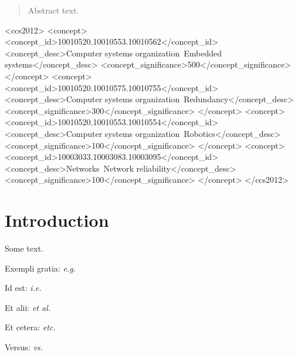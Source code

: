 \documentclass{sig-alternate-05-2015}
\newcommand{\eg}{\textit{e.g.}\xspace}
\newcommand{\etal}{\textit{et al.}\xspace}
\newcommand{\ie}{\textit{i.e.}\xspace}
\newcommand{\etc}{\textit{etc.}\xspace}
\newcommand{\vs}{\textit{vs.}\xspace}
\begin{document}
\maketitle
\begin{abstract}
Abstract text.
\end{abstract}


%
%
\begin{CCSXML}
<ccs2012>
 <concept>
  <concept_id>10010520.10010553.10010562</concept_id>
  <concept_desc>Computer systems organization~Embedded systems</concept_desc>
  <concept_significance>500</concept_significance>
 </concept>
 <concept>
  <concept_id>10010520.10010575.10010755</concept_id>
  <concept_desc>Computer systems organization~Redundancy</concept_desc>
  <concept_significance>300</concept_significance>
 </concept>
 <concept>
  <concept_id>10010520.10010553.10010554</concept_id>
  <concept_desc>Computer systems organization~Robotics</concept_desc>
  <concept_significance>100</concept_significance>
 </concept>
 <concept>
  <concept_id>10003033.10003083.10003095</concept_id>
  <concept_desc>Networks~Network reliability</concept_desc>
  <concept_significance>100</concept_significance>
 </concept>
</ccs2012>
\end{CCSXML}



%
%

%
%
\printccsdesc



\section{Introduction}

Some text. \cite{example}

Exempli gratia: \eg

Id est: \ie

Et alii: \etal

Et cetera: \etc

Versus: \vs
\end{document}
